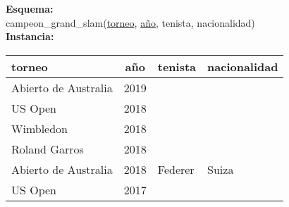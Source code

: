 \documentclass[preview]{standalone}
\begin{document}
\textbf{Esquema:}\\
campeon\_grand\_slam(\underline{torneo}, \underline{a\~no}, tenista, nacionalidad)\\

\textbf{Instancia:}
\begin{center}
\begin{tabular}{| l | c | l | l |}\hline			
	torneo & a\~no & tenista & nacionalidad  \\\hline			
	Abierto de Australia & 2019 & \color{red}{Djokovic} & \color{red}{Serbia} \\
	US Open & 2018 & \color{red}{Djokovic} & \color{red}{Serbia} \\
	Wimbledon & 2018 & \color{red}{Djokovic} & \color{red}{Serbia} \\
	Roland Garros & 2018 & \color{blue}{Nadal} & \color{blue}{Espa\~nola} \\
	Abierto de Australia & 2018 & Federer & Suiza \\
	US Open & 2017 & \color{blue}{Nadal} & \color{blue}{Espa\~nola} \\\hline
\end{tabular}
\end{center}
\end{document}
